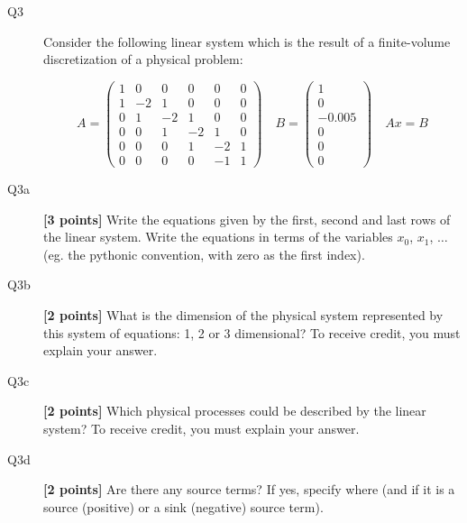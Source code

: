 \documentclass{article}
\begin{document}
\begin{description}


\item[Q3] Consider the following linear system which is the result of a finite-volume discretization of a physical problem:

\begin{equation}
A = \left( \begin{array}{cccccc}
    1 & 0 & 0 & 0 & 0 & 0 \\
    1 & -2 & 1 & 0 & 0 & 0 \\
    0 & 1 & -2 & 1  & 0 & 0 \\
    0 & 0 & 1 & -2 & 1  & 0 \\
    0 & 0 & 0 & 1 & -2 & 1  \\
    0 & 0 & 0 & 0 & -1 & 1 
\end{array}
\right) \quad B = \left( \begin{array}{c}
    1  \\
    0 \\
    -0.005 \\
    0  \\
    0  \\
    0  
\end{array} \right)  \quad Ax=B
\end{equation} 


\item [Q3a]  \textbf{[3 points]} Write the equations given by the first, second and last rows of the linear system. Write the equations in terms of the variables $x_0$, $x_1$, $\ldots$ (eg. the pythonic convention, with zero as the first index).

\vspace{2cm}
\item [Q3b]  \textbf{[2 points]} What is the dimension of the physical system represented by this system of equations: 1, 2 or 3 dimensional? To receive credit, you must explain your answer.  
\vspace{2cm}

\item [Q3c] \textbf{[2 points]} Which physical processes could be described by the linear system?  To receive credit, you must explain your answer.
\vspace{2cm}

\item [Q3d]  \textbf{[2 points]} Are there any source terms? If yes, specify where (and if it is a source (positive) or a sink (negative) source term).
\vspace{2cm}


\end{description}
\end{document}
